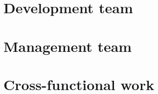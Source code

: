 \documentclass[12pt]{article}
\begin{document}
    \pagebreak
    \section{Development team}
    
   
    \pagebreak
    \section{Management team}
    
 
    \pagebreak
    \section{Cross-functional work}
    
    
\end{document}
